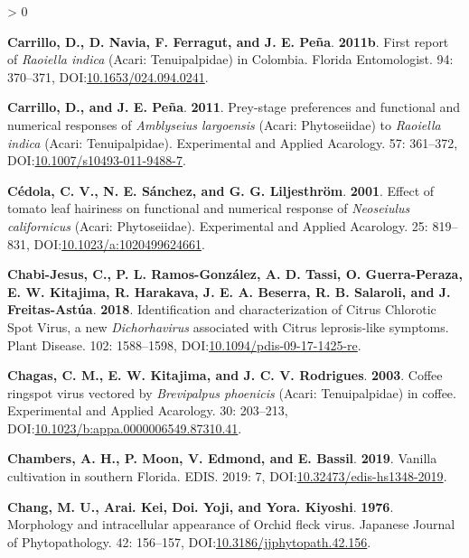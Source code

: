 \documentclass{ufdissertation}[overrideChapters] %
\newlength{\cslhangindent}
\newenvironment{CSLReferences}[2] %
 {%
  \setlength{\parindent}{0pt}
  \ifodd #1 \everypar{\setlength{\hangindent}{\cslhangindent}}\ignorespaces\fi
  \ifnum #2 > 0
  \setlength{\parskip}{#2\baselineskip}
  \fi
 }%
 {}
\begin{document}
{\begin{CSLReferences}{1}{1}
\leavevmode{}%
\textbf{Carrillo, D., D. Navia, F. Ferragut, and J. E. Peña}. \textbf{2011b}. First report of {\emph{Raoiella indica}} ({Acari}: {Tenuipalpidae}) in {Colombia}. Florida Entomologist. 94: 370--371, DOI:\href{https://doi.org/10.1653/024.094.0241}{10.1653/024.094.0241}.

\leavevmode{}%
\textbf{Carrillo, D., and J. E. Peña}. \textbf{2011}. Prey-stage preferences and functional and numerical responses of {\emph{Amblyseius largoensis}} ({Acari: Phytoseiidae}) to {\emph{Raoiella indica}} ({Acari}: {Tenuipalpidae}). Experimental and Applied Acarology. 57: 361--372, DOI:\href{https://doi.org/10.1007/s10493-011-9488-7}{10.1007/s10493-011-9488-7}.

\leavevmode{}%
\textbf{Cédola, C. V., N. E. Sánchez, and G. G. Liljesthröm}. \textbf{2001}. Effect of tomato leaf hairiness on functional and numerical response of {\emph{Neoseiulus californicus}} ({Acari}: {Phytoseiidae}). Experimental and Applied Acarology. 25: 819--831, DOI:\href{https://doi.org/10.1023/a:1020499624661}{10.1023/a:1020499624661}.

\leavevmode{}%
\textbf{Chabi-Jesus, C., P. L. Ramos-González, A. D. Tassi, O. Guerra-Peraza, E. W. Kitajima, R. Harakava, J. E. A. Beserra, R. B. Salaroli, and J. Freitas-Astúa}. \textbf{2018}. Identification and characterization of {Citrus Chlorotic Spot Virus}, a new {\emph{Dichorhavirus}} associated with {Citrus leprosis}-like symptoms. Plant Disease. 102: 1588--1598, DOI:\href{https://doi.org/10.1094/pdis-09-17-1425-re}{10.1094/pdis-09-17-1425-re}.

\leavevmode{}%
\textbf{Chagas, C. M., E. W. Kitajima, and J. C. V. Rodrigues}. \textbf{2003}. {Coffee ringspot virus} vectored by {\emph{Brevipalpus phoenicis}} ({Acari}: {Tenuipalpidae}) in coffee. Experimental and Applied Acarology. 30: 203--213, DOI:\href{https://doi.org/10.1023/b:appa.0000006549.87310.41}{10.1023/b:appa.0000006549.87310.41}.

\leavevmode{}%
\textbf{Chambers, A. H., P. Moon, V. Edmond, and E. Bassil}. \textbf{2019}. Vanilla cultivation in southern {Florida}. {EDIS}. 2019: 7, DOI:\href{https://doi.org/10.32473/edis-hs1348-2019}{10.32473/edis-hs1348-2019}.

\leavevmode{}%
\textbf{Chang, M. U., Arai. Kei, Doi. Yoji, and Yora. Kiyoshi}. \textbf{1976}. Morphology and intracellular appearance of {Orchid fleck virus}. Japanese Journal of Phytopathology. 42: 156--157, DOI:\href{https://doi.org/10.3186/jjphytopath.42.156}{10.3186/jjphytopath.42.156}.


\end{CSLReferences}}
\end{document}
